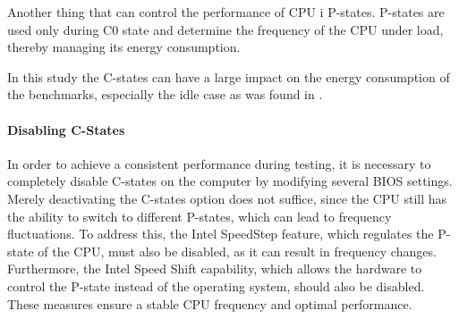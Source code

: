 Another thing that can control the performance of CPU i P-states. P-states are used only during C0 state and determine the frequency of the CPU under load, thereby managing its energy consumption.







In this study the C-states can have a large impact on the energy consumption of the benchmarks, especially the idle case as was found in \cite{biksbois}.

\paragraph{Disabling C-States}
In order to achieve a consistent performance during testing, it is necessary to completely disable C-states on the computer by modifying several BIOS settings. Merely deactivating the C-states option does not suffice, since the CPU still has the ability to switch to different P-states, which can lead to frequency fluctuations. To address this, the Intel SpeedStep\cite{IntelSpeedStep} feature, which regulates the P-state of the CPU, must also be disabled, as it can result in frequency changes. Furthermore, the Intel Speed Shift\cite{IntelSpeedShift} capability, which allows the hardware to control the P-state instead of the operating system, should also be disabled. These measures ensure a stable CPU frequency and optimal performance.